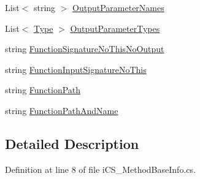 \begin{DoxyCompactItemize}
\item 
List$<$ string $>$ \hyperlink{classi_c_s___method_base_info_ac7c0681e6d9a7bf8972b4f84f242db01}{Output\+Parameter\+Names}
\item 
List$<$ \hyperlink{i_c_s___object_type_enum_8cs_ae6c3dd6d8597380b56d94908eb431547aa1fa27779242b4902f7ae3bdd5c6d508}{Type} $>$ \hyperlink{classi_c_s___method_base_info_acf0e1ba1a5e873dce4fbd0666bbab4f9}{Output\+Parameter\+Types}
\item 
string \hyperlink{classi_c_s___method_base_info_af722eb2e3b161eaefab999b2791e2c9d}{Function\+Signature\+No\+This\+No\+Output}
\item 
string \hyperlink{classi_c_s___method_base_info_a3db874977d8e777ba73846aef565761a}{Function\+Input\+Signature\+No\+This}
\item 
string \hyperlink{classi_c_s___method_base_info_a38202bc792d862412188ebc960cb4f6a}{Function\+Path}
\item 
string \hyperlink{classi_c_s___method_base_info_a72d6cf5953f08512f4eab75d798aafea}{Function\+Path\+And\+Name}
\end{DoxyCompactItemize}


\subsection{Detailed Description}


Definition at line 8 of file i\+C\+S\+\_\+\+Method\+Base\+Info.\+cs.



